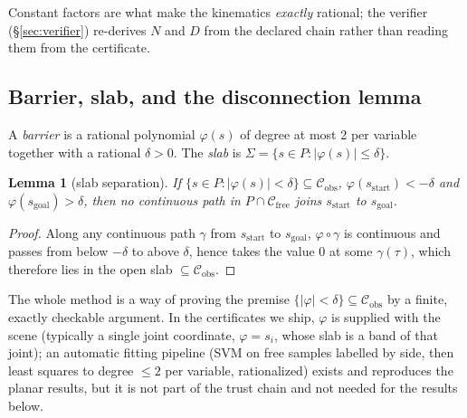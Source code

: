\documentclass[10pt,twocolumn,letterpaper]{article}
\newtheorem{lemma}{Lemma}
\newcommand{\Cobs}{\mathcal{C}_{\mathrm{obs}}}
\newcommand{\Cfree}{\mathcal{C}_{\mathrm{free}}}
\newcommand{\vphi}{\varphi}
\begin{document}
Constant factors are what make the kinematics \emph{exactly} rational; the verifier (\S\ref{sec:verifier}) re-derives $N$ and $D$ from the declared chain rather than reading them from the certificate.

\subsection{Barrier, slab, and the disconnection lemma}
A \emph{barrier} is a rational polynomial $\vphi(s)$ of degree at most 2 per variable together with a rational $\delta>0$. The \emph{slab} is $\Sigma=\{s\in P:|\vphi(s)|\le\delta\}$.

\begin{lemma}[slab separation]\label{lem:slab}
If $\{s\in P:|\vphi(s)|<\delta\}\subseteq\Cobs$, $\vphi(s_{\mathrm{start}})<-\delta$ and $\vphi(s_{\mathrm{goal}})>\delta$, then no continuous path in $P\cap\Cfree$ joins $s_{\mathrm{start}}$ to $s_{\mathrm{goal}}$.
\end{lemma}
\begin{proof}
Along any continuous path $\gamma$ from $s_{\mathrm{start}}$ to $s_{\mathrm{goal}}$, $\vphi\circ\gamma$ is continuous and passes from below $-\delta$ to above $\delta$, hence takes the value 0 at some $\gamma(\tau)$, which therefore lies in the open slab $\subseteq\Cobs$.
\end{proof}

The whole method is a way of proving the premise $\{|\vphi|<\delta\}\subseteq\Cobs$ by a finite, exactly checkable argument. In the certificates we ship, $\vphi$ is supplied with the scene (typically a single joint coordinate, $\vphi=s_i$, whose slab is a band of that joint); an automatic fitting pipeline (SVM on free samples labelled by side, then least squares to degree $\le2$ per variable, rationalized) exists and reproduces the planar results, but it is not part of the trust chain and not needed for the results below.
\end{document}

